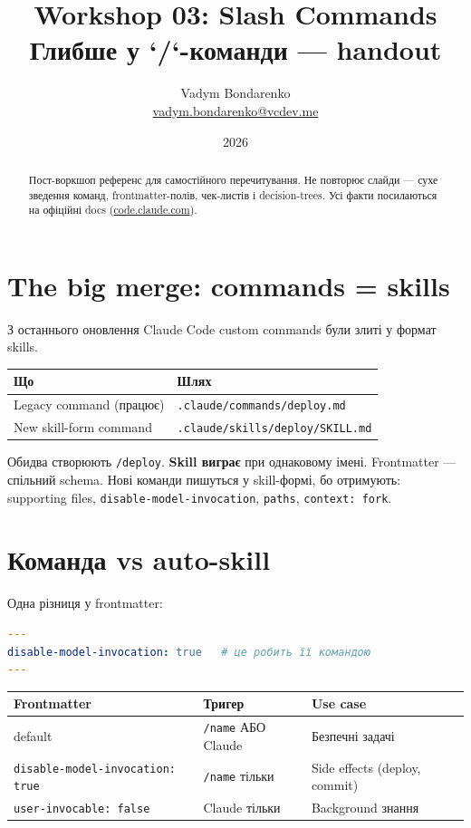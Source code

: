 \documentclass[11pt,a4paper]{article}
\title{%
  {\Huge\bfseries Workshop 03: Slash Commands}\\[0.6em]
  {\large Глибше у `/`-команди --- handout}
}
\author{Vadym Bondarenko \\ \small\href{mailto:vadym.bondarenko@vcdev.me}{vadym.bondarenko@vcdev.me}}
\date{2026}
\begin{document}
\maketitle

\begin{abstract}
Пост-воркшоп референс для самостійного перечитування. Не повторює слайди --- сухе зведення команд, frontmatter-полів, чек-листів і decision-trees. Усі факти посилаються на офіційні docs (\href{https://code.claude.com/docs/en/skills}{code.claude.com}).
\end{abstract}

\tableofcontents
\newpage

\section{The big merge: commands = skills}

З останнього оновлення Claude Code custom commands були злиті у формат skills.

\begin{tabular}{ll}
\hline
\textbf{Що} & \textbf{Шлях} \\
\hline
Legacy command (працює) & \texttt{.claude/commands/deploy.md} \\
New skill-form command   & \texttt{.claude/skills/deploy/SKILL.md} \\
\hline
\end{tabular}

Обидва створюють \texttt{/deploy}. \textbf{Skill виграє} при однаковому імені. Frontmatter --- спільний schema. Нові команди пишуться у skill-формі, бо отримують: supporting files, \texttt{disable-model-invocation}, \texttt{paths}, \texttt{context: fork}.

\section{Команда vs auto-skill}

Одна різниця у frontmatter:

\begin{lstlisting}[language=yaml]
---
disable-model-invocation: true   # це робить її командою
---
\end{lstlisting}

\begin{tabular}{lll}
\hline
\textbf{Frontmatter} & \textbf{Тригер} & \textbf{Use case} \\
\hline
default                            & \texttt{/name} АБО Claude          & Безпечні задачі \\
\texttt{disable-model-invocation: true} & \texttt{/name} тільки         & Side effects (deploy, commit) \\
\texttt{user-invocable: false}     & Claude тільки                      & Background знання \\
\hline
\end{tabular}
\end{document}
